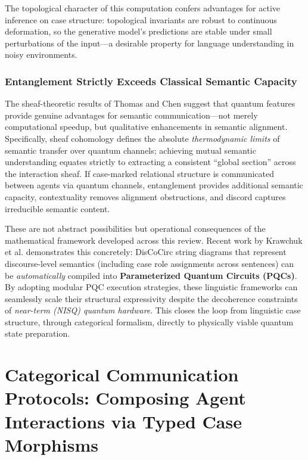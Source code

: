 \documentclass[
]{article}
\begin{document}
The topological character of this computation confers advantages for
active inference on case structure: topological invariants are robust to
continuous deformation, so the generative model's predictions are stable
under small perturbations of the input---a desirable property for
language understanding in noisy environments.

\subsubsection{Entanglement Strictly Exceeds Classical Semantic
Capacity}\label{entanglement-strictly-exceeds-classical-semantic-capacity}

The sheaf-theoretic results of Thomas and Chen
\citeyearpar{thomas2025quantum} suggest that quantum features provide
genuine advantages for semantic communication---not merely computational
speedup, but qualitative enhancements in semantic alignment.
Specifically, sheaf cohomology defines the absolute \emph{thermodynamic
limits} of semantic transfer over quantum channels; achieving mutual
semantic understanding equates strictly to extracting a consistent
``global section'' across the interaction sheaf. If case-marked
relational structure is communicated between agents via quantum
channels, entanglement provides additional semantic capacity,
contextuality removes alignment obstructions, and discord captures
irreducible semantic content.

These are not abstract possibilities but operational consequences of the
mathematical framework developed across this review. Recent work by
Krawchuk et al. \citeyearpar{krawchuk2025paramqnlp} demonstrates this
concretely: DisCoCirc string diagrams that represent discourse-level
semantics (including case role assignments across sentences) can be
\emph{automatically} compiled into \textbf{Parameterized Quantum
Circuits (PQCs)}. By adopting modular PQC execution strategies, these
linguistic frameworks can seamlessly scale their structural expressivity
despite the decoherence constraints of \emph{near-term (NISQ) quantum
hardware}. This closes the loop from linguistic case structure, through
categorical formalism, directly to physically viable quantum state
preparation.

\newpage

\section{Categorical Communication Protocols: Composing Agent
Interactions via Typed Case Morphisms}\label{sec:ai-implications}
\end{document}
